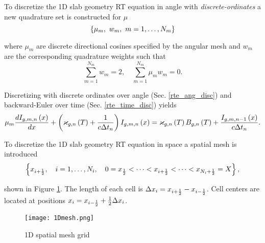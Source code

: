 	To discretize the 1D slab geometry RT equation in angle with \textit{discrete-ordinates} a new quadrature set is constructed for $\mu$
	\begin{equation}
		\left\{ \mu_m,\ w_m,\ m=1,\dots ,N_m \right\}
	\end{equation}
	
	where $\mu_m$ are discrete directional cosines specified by the angular mesh and $w_m$ are the corresponding quadrature weights such that
	\begin{equation}
		\sum_{m=1}^{N_m}w_m = 2, \quad \sum_{m=1}^{N_m}\mu_m w_m = 0.
	\end{equation}
	
	Discretizing  with discrete ordinates over angle (Sec. \ref{rte_ang_disc}) and backward-Euler over time (Sec. \ref{rte_time_disc}) yields
	\begin{equation}
		\mu_m\frac{dI_{g,m,n}\left( x\right)}{dx} + \left( \varkappa_{g,n}\left( T\right) + \frac{1}{c\Delta t_n} \right)I_{g,m,n}\left( x\right) = \varkappa_{g,n}\left( T\right)B_{g,n}\left( T\right) + \frac{I_{g,m,n-1}\left( x\right)}{c\Delta t_n}. \label{1D_RTEg_disc}
	\end{equation}	
	
	To discretize the 1D slab geometry RT equation in space a spatial mesh is introduced	
	\begin{equation}
		\left\{ x_{i+\frac{1}{2}}, \quad i=1,\dots ,N_i, \quad 0=x_{\frac{1}{2}}<\dots<x_{i+\frac{1}{2}}<\dots<x_{N_i+\frac{1}{2}}=X \right\}, \label{xmesh}
	\end{equation}
	
	shown in Figure \ref{fig:1Dmesh}. The length of each cell is $\Delta x_{i} = x_{i+\frac{1}{2}} - x_{i-\frac{1}{2}}$. Cell centers are located at positions $x_i = x_{i-\frac{1}{2}} + \frac{1}{2}\Delta x_{i}$.
	\begin{figure}[h]
		\centering
		\captionsetup{justification=centering,margin=2cm}
		\texttt{[image: 1Dmesh.png]}
		\caption{\label{fig:1Dmesh}
			1D spatial mesh grid}
	\end{figure}
	
	
